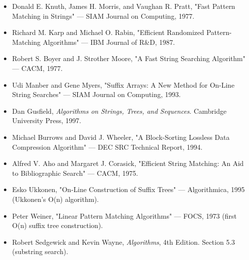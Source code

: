 \begin{itemize}
\item Donald E. Knuth, James H. Morris, and Vaughan R. Pratt, "Fast Pattern Matching in Strings" — SIAM Journal on Computing, 1977.
\item Richard M. Karp and Michael O. Rabin, "Efficient Randomized Pattern-Matching Algorithms" — IBM Journal of R\&D, 1987.
\item Robert S. Boyer and J. Strother Moore, "A Fast String Searching Algorithm" — CACM, 1977.
\item Udi Manber and Gene Myers, "Suffix Arrays: A New Method for On-Line String Searches" — SIAM Journal on Computing, 1993.
\item Dan Gusfield, \textit{Algorithms on Strings, Trees, and Sequences}. Cambridge University Press, 1997.
\item Michael Burrows and David J. Wheeler, "A Block-Sorting Lossless Data Compression Algorithm" — DEC SRC Technical Report, 1994.
\item Alfred V. Aho and Margaret J. Corasick, "Efficient String Matching: An Aid to Bibliographic Search" — CACM, 1975.
\item Esko Ukkonen, "On-Line Construction of Suffix Trees" — Algorithmica, 1995 (Ukkonen's O(n) algorithm).
\item Peter Weiner, "Linear Pattern Matching Algorithms" — FOCS, 1973 (first O(n) suffix tree construction).
\item Robert Sedgewick and Kevin Wayne, \textit{Algorithms}, 4th Edition. Section 5.3 (substring search).
\end{itemize}

